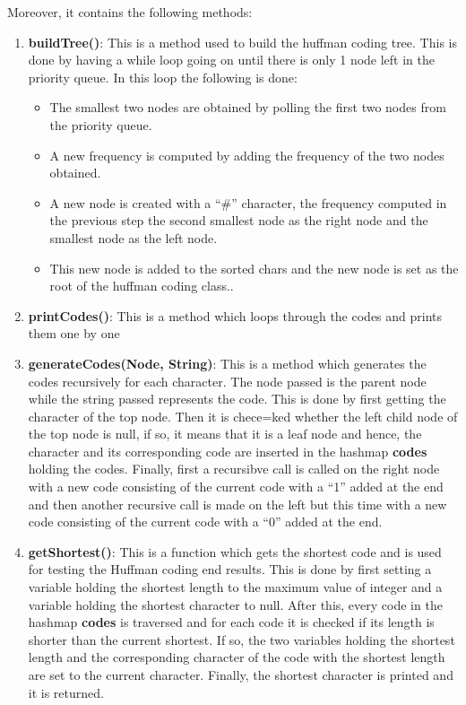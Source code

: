 \documentclass{article}
\newcommand{\quotes}[1]{``#1''}
\begin{document}
		Moreover, it contains the following methods: 
		
		\begin{enumerate}
		\item \textbf{buildTree()}: This is a method used to build the huffman coding tree. This is done by having a while loop going on until there is only 1 node left in the priority queue. In this loop the following is done:
		\begin{itemize}
			\item The smallest two nodes are obtained by polling the first two nodes from the priority queue. 
			\item A new frequency is computed by adding the frequency of the two nodes obtained.
			\item A new node is created with a \quotes{\#} character, the frequency computed in the previous step the second smallest node as the right node and the smallest node as the left node.
			\item This new node is added to the sorted chars and the new node is set as the root of the huffman coding class..
		\end{itemize}
		
		\item \textbf{printCodes()}: This is a method which loops through the codes and prints them one by one
		\item \textbf{generateCodes(Node, String)}: This is a method which generates the codes recursively for each character. The node passed is the parent node while the string passed represents the code. This is done by first getting the character of the top node. Then it is chece=ked whether the left child node of the top node is null, if so, it means that it is a leaf node and hence, the character and its corresponding code are inserted in the hashmap \textbf{codes} holding the codes. Finally, first a recursibve call is called on the right node with a new code consisting of the current code with a \quotes{1} added at the end and then another recursive call is made on the left but this time with a new code consisting of the current code with a \quotes{0} added at the end.
		\item \textbf{getShortest()}: This is a function which gets the shortest code and is used for testing the Huffman coding end results. This is done by first setting a variable holding the shortest length to the maximum value of integer and a variable holding the shortest character to null. After this, every code in the hashmap \textbf{codes} is traversed and for each code it is checked if its length is shorter than the current shortest. If so, the two variables holding the shortest length and the corresponding character of the code with the shortest length are set to the current character. Finally, the shortest character is printed and it is returned.
		

\end{enumerate}
\end{document}
